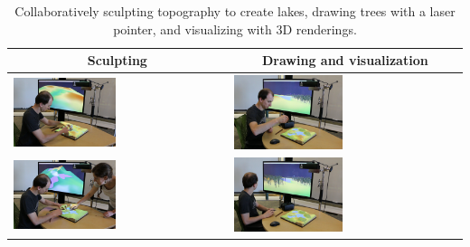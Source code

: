\documentclass[Afour,sagev,times]{sagej} %
\newcommand{\ra}[1]{\renewcommand{\arraystretch}{#1}}
\begin{document}
\begin{table}
\caption{Collaboratively sculpting topography to create lakes, 
drawing trees with a laser pointer, and visualizing with 3D renderings.}
\ra{1.3}
\begin{tabular}{m{} m{}}
\toprule
\multicolumn{1}{c}{Sculpting}  & \multicolumn{1}{c}{Drawing and visualization}\\
\midrule
%
\includegraphics[width=0.49\textwidth]{images/immersive/sculpting_lakes_2.png} &
\includegraphics[width=0.49\textwidth]{images/immersive/drawing_trees_1.png}\\
%
\includegraphics[width=0.49\textwidth]{images/immersive/sculpting_landforms_2.png} &
\includegraphics[width=0.49\textwidth]{images/immersive/drawing_trees_2.png}\\

\end{tabular}
\end{table}
\end{document}
